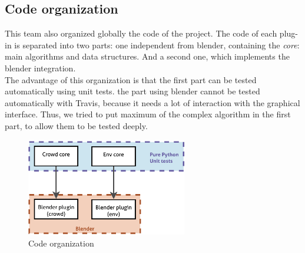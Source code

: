 \subsection{Code organization}
This team also organized globally the code of the project. The code of each plug-in is separated into two parts: one independent from blender, containing the \textit{core}: main algorithms and data structures. And a second one, which implements the blender integration.\\
The advantage of this organization is that the first part can be tested automatically using unit tests. the part using blender cannot be tested automatically with Travis, because it needs a lot of interaction with the graphical interface. 
Thus, we tried to put maximum of the complex algorithm in the first part, to allow them to be tested deeply.

\begin{figure}[h]
  \begin{center}
    \includegraphics[width=7cm]{img/orga.pdf}
    \caption{Code organization}
    \label{fig:code}
  \end{center}
\end{figure}
